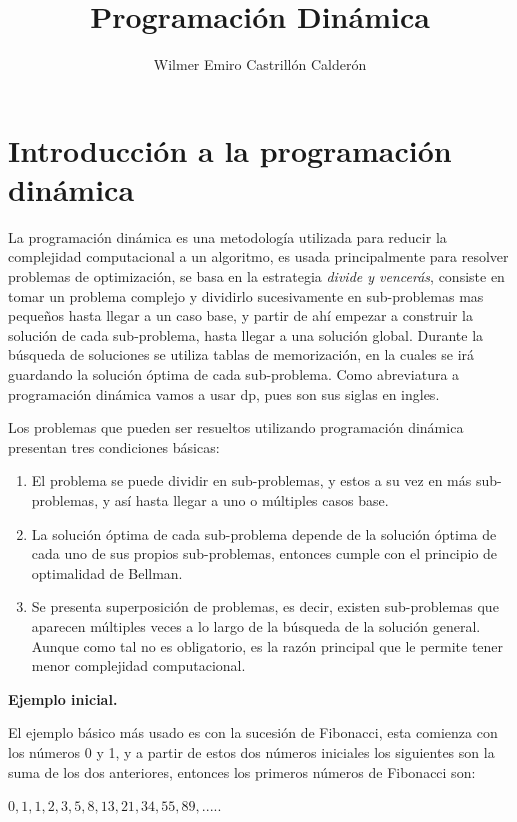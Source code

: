 \documentclass[12pt, a4paper]{article}
\title{\textbf{Programación Dinámica}}
\author{Wilmer Emiro Castrillón Calderón}
\newcommand{\subtitulo}[1]{\begin{center}\textbf{#1}\end{center}}
\begin{document}
	\maketitle
	
	
	\section{Introducción a la programación dinámica}
	
	La programación dinámica es una metodología utilizada para reducir la complejidad computacional a un
	algoritmo, es usada principalmente para resolver problemas de optimización,
	se basa en la estrategia \textit{divide y vencerás}, consiste en tomar un problema complejo y dividirlo 
	sucesivamente en sub-problemas mas pequeños hasta llegar a un caso base, y partir de ahí empezar a construir la
	solución de cada sub-problema, hasta llegar a una solución global. Durante la búsqueda de soluciones
	se utiliza tablas de memorización, en la cuales se irá guardando la solución óptima de cada sub-problema.
	Como abreviatura a programación dinámica vamos a usar dp, pues son sus siglas en ingles.
	
	Los problemas que pueden ser resueltos utilizando programación dinámica presentan tres condiciones básicas:
	\begin{enumerate}[1.]
		\item El problema se puede dividir en sub-problemas, y estos a su vez en más sub-problemas, y así hasta llegar
				a uno o múltiples casos base.
		\item La solución óptima de cada sub-problema depende de la solución óptima de cada uno de sus
				propios sub-problemas, entonces cumple con el principio de optimalidad de Bellman.
		\item Se presenta superposición de problemas, es decir, existen sub-problemas que aparecen múltiples veces
		 		a lo largo de la búsqueda de la solución general. Aunque como tal no es obligatorio, es la razón 
		 		principal que le permite tener menor complejidad computacional.
	\end{enumerate}
	
	\subtitulo{Ejemplo inicial.}
	
	El ejemplo básico más usado es con la sucesión de Fibonacci, esta comienza con los números 0 y 1, y a partir
	de estos dos números iniciales los siguientes son la suma de los dos anteriores, entonces los primeros
	números de Fibonacci son:
	\begin{center} $0, 1, 1, 2, 3, 5, 8, 13, 21, 34, 55, 89, ..... $ \end{center}
	
\end{document}
